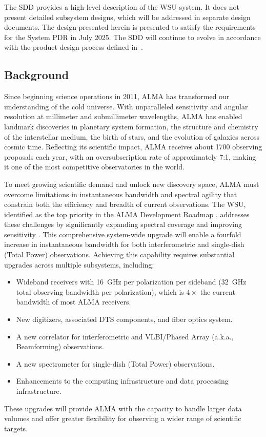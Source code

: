 The \ac{SDD} provides a high-level description of the WSU system. It does not present detailed subsystem designs, which will be addressed in separate design documents. The design presented herein is presented to satisfy the requirements~\cite{pa_req} for the System \ac{PDR} in July 2025. The \ac{SDD} will continue to evolve in accordance with the product design process defined in~\cite{pa_req}. 



 \subsection{Background}
\label{intro:background}

Since beginning science operations in 2011, ALMA has transformed our understanding of the cold universe. With unparalleled sensitivity and angular resolution at millimeter and submillimeter wavelengths, ALMA has enabled landmark discoveries in planetary system formation, the structure and chemistry of the interstellar medium, the birth of stars, and the evolution of galaxies across cosmic time. Reflecting its scientific impact, ALMA receives about 1700 observing proposals each year, with an oversubscription rate of approximately 7:1, making it one of the most competitive observatories in the world.

To meet growing scientific demand and unlock new discovery space, ALMA must overcome limitations in instantaneous bandwidth and spectral agility that constrain both the efficiency and breadth of current observations. The \ac{WSU}, identified as the top priority in the ALMA Development Roadmap \cite{road_map}, addresses these challenges by significantly expanding spectral coverage and improving sensitivity \cite{memo621}. This comprehensive system-wide upgrade will enable a fourfold increase in instantaneous bandwidth for both interferometric and single-dish (Total Power) observations. Achieving this capability requires substantial upgrades across multiple subsystems, including:
\begin{itemize}[itemsep=-0.5em]
    \item Wideband receivers with 16~GHz per polarization per sideband (32~GHz total observing bandwidth per polarization), which is $4\times$ the current bandwidth of most ALMA receivers.
    \item New digitizers, associated \ac{DTS} components, and fiber optics system.
    \item A new correlator for interferometric and \ac{VLBI}/Phased Array (a.k.a., Beamforming) observations.
    \item A new spectrometer for single-dish (Total Power) observations.
    \item Enhancements to the computing infrastructure and data processing infrastructure.
\end{itemize}
These upgrades will provide ALMA with the capacity to handle larger data volumes and offer greater flexibility for observing a wider range of scientific targets. %


